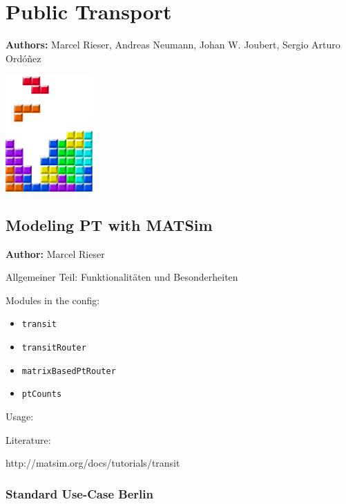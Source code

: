 \chapter{Public Transport }
\label{ch:pt}

\hfill \textbf{Authors:} Marcel Rieser, Andreas Neumann, Johan W. Joubert, Sergio Arturo Ordóñez

\begin{center} \includegraphics[width=0.25\textwidth, angle=0]{figures/MATSimBook.png} \end{center}

\section{Modeling PT with MATSim }
\hfill \textbf{Author:} Marcel Rieser

Allgemeiner Teil: Funktionalitäten und Besonderheiten

Modules in the config: 
\begin{itemize}
	\item \lstinline|transit|
	\item \lstinline|transitRouter|
	\item \lstinline|matrixBasedPtRouter|
	\item \lstinline|ptCounts|
\end{itemize}

Usage:

Literature: \citet[][]{RieserNagel_IATBR_2009, Rieser_PhDThesis_2010}

http://matsim.org/docs/tutorials/transit

\subsection{Standard Use-Case Berlin}

